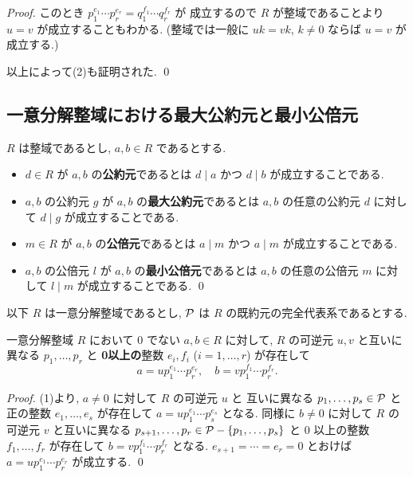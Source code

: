 \documentclass[12pt,twoside]{jarticle}
\begin{document}
\begin{proof}
このとき $p_1^{e_1}\cdots p_r^{e_r} = q_1^{f_1}\cdots q_r^{f_r}$ が
成立するので $R$ が整域であることより $u=v$ が成立することもわかる.
(整域では一般に $uk=vk$, $k\ne 0$ ならば $u=v$ が成立する.)

以上によって(2)も証明された.
\qed
\end{proof}


\subsection{一意分解整域における最大公約元と最小公倍元}

\begin{definition}
 $R$ は整域であるとし, $a,b\in R$ であるとする.
 \begin{itemize}
  \item $d\in R$ が $a,b$ の{\bf 公約元}であるとは $d\mid a$ かつ $d\mid b$
   が成立することである.
  \item $a,b$ の公約元 $g$ が $a,b$ の{\bf 最大公約元}であるとは %
   $a,b$ の任意の公約元 $d$ に対して $d\mid g$ が成立することである.
  \item $m\in R$ が $a,b$ の{\bf 公倍元}であるとは $a\mid m$ かつ $a\mid m$
   が成立することである.
  \item $a,b$ の公倍元 $l$ が $a,b$ の{\bf 最小公倍元}であるとは %
   $a,b$ の任意の公倍元 $m$ に対して $l\mid m$ が成立することである.
   \qed
 \end{itemize}
\end{definition}

以下 $R$ は一意分解整域であるとし, 
${\mathcal P}$ は $R$ の既約元の完全代表系であるとする.

\begin{lemma}
\label{lemma:1}
 一意分解整域 $R$ において $0$ でない $a,b\in R$ に対して, 
 $R$ の可逆元 $u,v$ と互いに異なる $p_1,\ldots,p_r$ と %
 {\bf 0以上の}整数 $e_i,f_i$ ($i=1,\ldots,r$) が存在して
 \begin{equation*}
   a = up_1^{e_1}\cdots p_r^{e_r}, \quad 
   b = vp_1^{f_1}\cdots p_r^{f_r}.
   \tag{$*$}
 \end{equation*}
\end{lemma}

\begin{proof}
  (1)より, 
 $a\ne 0$ に対して $R$ の可逆元 $u$ と
 互いに異なる $p_1,\ldots,p_s\in{\mathcal P}$ と正の整数 $e_1,\ldots,e_s$ 
 が存在して $a=up_1^{e_1}\cdots p_s^{e_s}$ となる.
 同様に $b\ne 0$ に対して $R$ の可逆元 $v$ 
 と互いに異なる $p_{s+1},\ldots,p_r\in{\mathcal P}-\{p_1,\ldots,p_s\}$
 と $0$ 以上の整数 $f_1,\ldots,f_r$ 
 が存在して $b=vp_1^{f_1}\cdots p_r^{f_r}$ となる.
 $e_{s+1}=\cdots=e_r=0$ とおけば %
 $a=up_1^{e_1}\cdots p_r^{e_r}$ が成立する.
 \qed
\end{proof}
\end{document}
